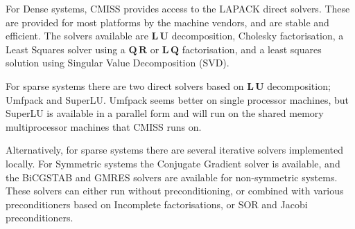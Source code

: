 For Dense systems, CMISS provides access to the LAPACK direct solvers.
These are provided for most platforms by the machine vendors, and are 
stable and efficient. The solvers available are $\mathbf{L \, U}$ decomposition,
Cholesky factorisation, a Least Squares solver using a $\mathbf{Q \, R}$ or
$\mathbf{L \, Q}$ factorisation, and a least squares solution using Singular
Value Decomposition (SVD).

For sparse systems there are two direct solvers based on $\mathbf{L \, U}$ 
decomposition; Umfpack and SuperLU. Umfpack seems better on single processor 
machines, but SuperLU is available in a parallel form and will run on 
the shared memory multiprocessor machines that CMISS runs on.

Alternatively, for sparse systems there are several iterative solvers
implemented locally. For Symmetric systems the Conjugate Gradient solver 
is available, and the BiCGSTAB and GMRES solvers are available for 
non-symmetric systems. These solvers can either run without preconditioning, 
or combined with various preconditioners based on Incomplete factorisations, 
or SOR and Jacobi preconditioners.



